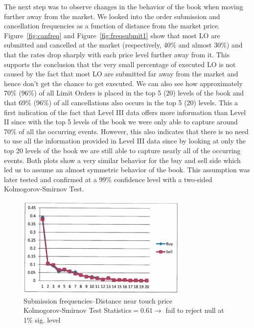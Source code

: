 The next step was to observe changes in the behavior of the book when moving further away from the market. We looked into the order submission and cancellation frequencies as a function of distance from the market price. Figure~\ref{fig:canfreq} and Figure~\ref{fig:freqsubmit1} show that most LO are submitted and cancelled at the market (respectively, 40\% and almost 30\%) and that the rates drop sharply with each price level further away from it. This supports the conclusion that the very small percentage of executed LO is not caused by the fact that most LO are submitted far away from the market and hence don't get the chance to get executed. We can also see how approximately 70\% (96\%) of all Limit Orders is placed in the top 5 (20) levels of the book and that 69\% (96\%) of all cancellations also occurs in the top 5 (20) levels. This a first indication of the fact that Level III data offers more information than Level II since with the top 5 levels of the book we were only able to capture around 70\% of all the occurring events. However, this also indicates that there is no need to use all the information provided in Level III data since by looking at only the top 20 levels of the book we are still able to capture nearly all of the occurring events. Both plots show a very similar behavior for the buy and sell side which led us to assume an almost symmetric behavior of the book. This assumption was later tested and confirmed at a 99\% confidence level with a two-sided Kolmogorov-Smirnov Test. 
	\begin{figure}[!ht]
   	\centering
   	\includegraphics[width=0.75\textwidth]{chapters/chapter_trade_data_models/figures/subfreqnear.png} 
   	\caption{Submission frequencies--Distance near touch price \\ Kolmogorov-Smirnov Test Statistics$=0.61 \to$ fail to reject null at 1\% sig. level \label{fig:subfreqnear}}
	\end{figure}
